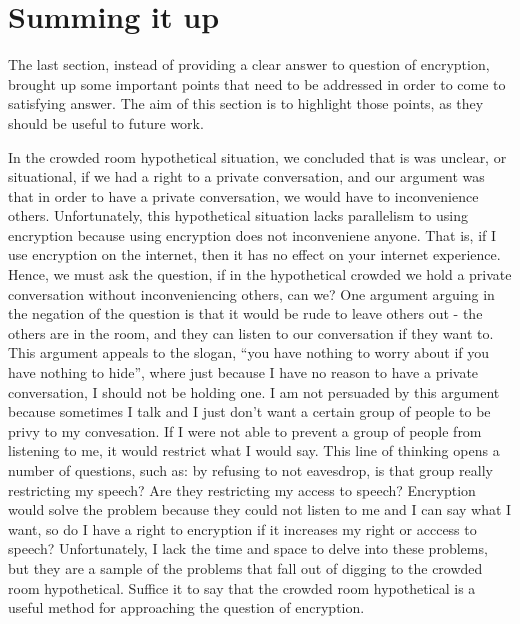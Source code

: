 \documentclass[11pt]{article}
\begin{document}
\section{Summing it up}
The last section, instead of providing a clear answer to question of encryption, brought up some important points that need to be addressed in order to come to satisfying answer.
The aim of this section is to highlight those points, as they should be useful to future work.

In the crowded room hypothetical situation, we concluded that is was unclear, or situational, if we had a right to a private conversation, and our argument was that in order to have a private conversation, we would have to inconvenience others.
Unfortunately, this hypothetical situation lacks parallelism to using encryption because using encryption does not inconveniene anyone. 
That is, if I use encryption on the internet, then it has no effect on your internet experience.
Hence, we must ask the question, if in the hypothetical crowded we hold a private conversation without inconveniencing others, can we?
One argument arguing in the negation of the question is that it would be rude to leave others out - the others are in the room, and they can listen to our conversation if they want to.
This argument appeals to the slogan, ``you have nothing to worry about if you have nothing to hide'', where just because I have no reason to have a private conversation, I should not be holding one.
I am not persuaded by this argument because sometimes I talk and I just don't want a certain group of people to be privy to my convesation.
If I were not able to prevent a group of people from listening to me, it would restrict what I would say.
This line of thinking opens a number of questions, such as: by refusing to not eavesdrop, is that group really restricting my speech? Are they restricting my access to speech? 
Encryption would solve the problem because they could not listen to me and I can say what I want, so do I have a right to encryption if it increases my right or acccess to speech?
Unfortunately, I lack the time and space to delve into these problems, but they are a sample of the problems that fall out of digging to the crowded room hypothetical.
Suffice it to say that the crowded room hypothetical is a useful method for approaching the question of encryption.
\end{document}
